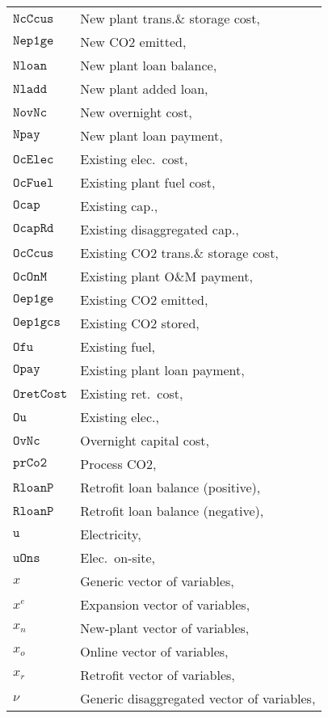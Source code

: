 \documentclass{amsart}
\begin{document}
\begin{longtable}[c]{@{}ll@{}}
    $\mathtt{NcCcus}$ & New plant trans.\& storage cost, \\
    $\mathtt{Nep1ge}$ & New CO2 emitted, \\
    $\mathtt{Nloan}$	& New plant loan balance, \\
    $\mathtt{Nladd}$	& New plant added loan, \\
    $\mathtt{NovNc}$ & New overnight cost, \\
    $\mathtt{Npay}$	& New plant loan payment, \\
    $\mathtt{OcElec}$ & Existing elec.\ cost, \\
    $\mathtt{OcFuel}$ & Existing plant fuel cost, \\
    $\mathtt{Ocap}$ & Existing cap., \\
    $\mathtt{OcapRd}$ & Existing disaggregated cap., \\
    $\mathtt{OcCcus}$ & Existing CO2 trans.\& storage cost, \\
    $\mathtt{OcOnM}$ & Existing plant O\&M payment, \\
    $\mathtt{Oep1ge}$ & Existing CO2 emitted, \\
    $\mathtt{Oep1gcs}$ & Existing CO2 stored, \\
    $\mathtt{Ofu}$ & Existing fuel, \\
    $\mathtt{Opay}$	& Existing plant loan payment, \\
    $\mathtt{OretCost}$	& Existing ret.\ cost, \\
    $\mathtt{Ou}$ & Existing elec., \\
    $\mathtt{OvNc}$	& Overnight capital cost, \\
    $\mathtt{prCo2}$	& Process CO2, \\
    $\mathtt{RloanP}$	& Retrofit loan balance (positive), \\
    $\mathtt{RloanP}$	& Retrofit loan balance (negative), \\
    $\mathtt{u}$	& Electricity, \\
    $\mathtt{uOns}$	& Elec.\ on-site, \\
    $x$	& Generic vector of variables, \\
    $x^e$	& Expansion vector of variables, \\
    $x_n$	& New-plant vector of variables, \\
    $x_o$	& Online vector of variables, \\
    $x_r$	& Retrofit vector of variables, \\
    $\nu$	& Generic disaggregated vector of variables, \\
 \end{longtable}
\end{document}
